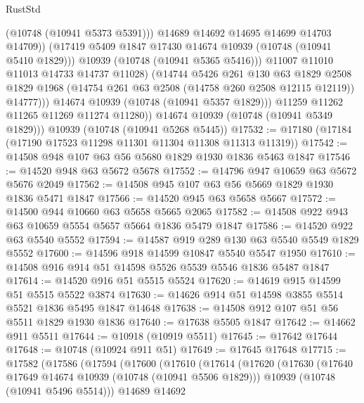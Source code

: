 \begin{lexlean}{RustStd}
\begin{coremodule}
{\begin{coremodule}
{{{{{                          (@10748 (@10941 @5373 @5391)))
                        @14689
                        @14692
                        @14695
                        @14699
                        @14703
                        @14709))
                    (@17419 @5409 @1847 @17430 @14674 @10939 (@10748 (@10941 @5410 @1829)))
                    @10939
                    (@10748 (@10941 @5365 @5416)))
                  @11007
                  @11010
                  @11013
                  @14733
                  @14737
                  @11028)
                (@14744
                  @5426
                  @261
                  @130
                  @63
                  @1829
                  @2508
                  @1829
                  @1968
                  (@14754 @261 @63 @2508 (@14758 @260 @2508 @12115 @12119))
                  @14777)))
            @14674
            @10939
            (@10748 (@10941 @5357 @1829)))
          @11259
          @11262
          @11265
          @11269
          @11274
          @11280))
      @14674
      @10939
      (@10748 (@10941 @5349 @1829)))
    @10939
    (@10748 (@10941 @5268 @5445))
@17532 := @17180 (@17184 (@17190 @17523 @11298 @11301 @11304 @11308 @11313 @11319))
@17542 := @14508 @948 @107 @63 @56 @5680 @1829 @1930 @1836 @5463 @1847
@17546 := @14520 @948 @63 @5672 @5678
@17552 := @14796 @947 @10659 @63 @5672 @5676 @2049
@17562 := @14508 @945 @107 @63 @56 @5669 @1829 @1930 @1836 @5471 @1847
@17566 := @14520 @945 @63 @5658 @5667
@17572 := @14500 @944 @10660 @63 @5658 @5665 @2065
@17582 := @14508 @922 @943 @63 @10659 @5554 @5657 @5664 @1836 @5479 @1847
@17586 := @14520 @922 @63 @5540 @5552
@17594 := @14587 @919 @289 @130 @63 @5540 @5549 @1829 @5552
@17600 := @14596 @918 @14599 @10847 @5540 @5547 @1950
@17610 := @14508 @916 @914 @51 @14598 @5526 @5539 @5546 @1836 @5487 @1847
@17614 := @14520 @916 @51 @5515 @5524
@17620 := @14619 @915 @14599 @51 @5515 @5522 @3874
@17630 := @14626 @914 @51 @14598 @3855 @5514 @5521 @1836 @5495 @1847 @14648
@17638 := @14508 @912 @107 @51 @56 @5511 @1829 @1930 @1836
@17640 := @17638 @5505 @1847
@17642 := @14662 @911 @5511
@17644 := @10918 (@10919 @5511)
@17645 := @17642 @17644
@17648 := @10748 (@10924 @911 @51)
@17649 := @17645 @17648
@17715 := @17582
    (@17586
      (@17594
        (@17600
          (@17610
            (@17614
              (@17620
                (@17630
                  (@17640 @17649 @14674 @10939 (@10748 (@10941 @5506 @1829)))
                  @10939
                  (@10748 (@10941 @5496 @5514)))
                @14689
                @14692
}}}}}
\end{coremodule}}
\end{coremodule}
\end{lexlean}
